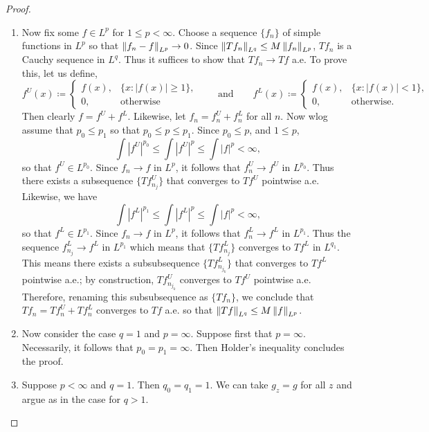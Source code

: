 \documentclass{article}
\begin{document}
\begin{proof}
\begin{enumerate}[itemsep =-2pt,label= (\arabic{*})]
		\item Now fix some $f \in L^{p}$ for $1 \leq p < \infty$. Choose a sequence $\{f_{n}\}$ of simple functions in $L^{p}$ so that $\left\Vert f_{n} - f \right\Vert_{L^{p}} \to 0$. Since $\left\Vert Tf_{n} \right\Vert_{L^{q}} \leq M\left\Vert f_{n} \right\Vert_{L^{p}}$, $Tf_{n}$ is a Cauchy sequence in $L^{q}$. Thus it suffices to show that $Tf_{n}\to Tf$ a.e. To prove this, let us define, 
		\begin{equation*}
			f^{U}(x) \coloneqq 
			\begin{cases}
				f(x), & \{x: |f(x)| \geq 1\}, \\
				0, & \text{otherwise}
			\end{cases} 
			\qquad \text{and} \qquad 
			f^{L}(x) \coloneqq 
			\begin{cases}
				f(x), & \{x: |f(x)| < 1\}, \\
				0, & \text{otherwise}. 
			\end{cases} 
		\end{equation*} 
		Then clearly $f = f^{U} + f^{L}$. Likewise, let $f_{n} = f^{U}_{n} + f^{L}_{n}$ for all $n$. Now wlog assume that $p_{0} \leq p_{1}$ so that $p_{0} \leq p \leq p_{1}$. Since $p_{0} \leq p$, and $1 \leq p$, 
		\begin{equation*}
			\int |f^{U}|^{p_{0}} \leq \int |f^{U}|^{p} \leq \int |f|^{p} < \infty, 
		\end{equation*} 
		so that $f^{U} \in L^{p_{0}}$. Since $f_{n} \to f$ in $L^{p}$, it follows that $f_{n}^{U} \to f^{U}$ in $L^{p_{0}}$. Thus there exists a subsequence $\{Tf_{n_{j}}^{U}\}$ that converges to $Tf^{U}$ pointwise a.e. Likewise, we have 
		\begin{equation*}
			\int |f^{L}|^{p_{1}} \leq \int |f^{L}|^{p} \leq \int |f|^{p} < \infty, 
		\end{equation*} 
		so that $f^{L} \in L^{p_{1}}$. Since $f_{n} \to f$ in $L^{p}$, it follows that $f_{n}^{L} \to f^{L}$ in $L^{p_{1}}$. Thus the sequence $f_{n_{j}}^{L} \to f^{L}$ in $L^{p_{1}}$ which means that $\{Tf_{n_{j}}^{L}\}$ converges to $Tf^{L}$ in $L^{q_{1}}$. This means there exists a subsubsequence $\{Tf_{n_{j_{k}}}^{L}\}$ that converges to $Tf^{L}$ pointwise a.e.; by construction, $Tf_{n_{j_{k}}}^{U}$ converges to $Tf^{U}$ pointwise a.e. Therefore, renaming this subsubsequence as $\{Tf_{n}\}$, we conclude that $Tf_{n} = Tf_{n}^{U} + Tf_{n}^{L}$ converges to $Tf$ a.e. so that $\left\Vert Tf \right\Vert_{L^{q}} \leq M \left\Vert f \right\Vert_{L^{p}}$. 
		
		\item Now consider the case $q = 1$ and $p = \infty$. Suppose first that $p = \infty$. Necessarily, it follows that $p_{0} = p_{1} = \infty$. Then H\:older's inequality concludes the proof. 
		\item Suppose $p < \infty$ and $q = 1$. Then $q_{0} = q_{1} = 1$. We can take $g_{z} = g$ for all $z$ and argue as in the case for $q > 1$. 
	\end{enumerate}
\end{proof} 
\end{document}
